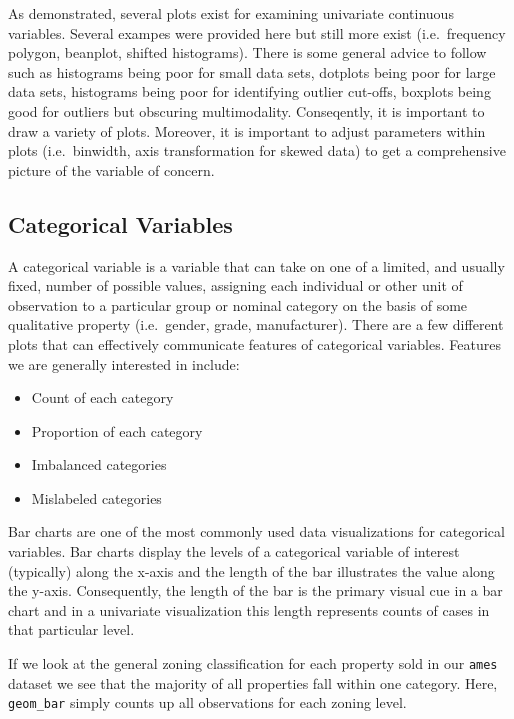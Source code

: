 \documentclass[]{article}
\providecommand{\tightlist}{%
  \setlength{\itemsep}{0pt}\setlength{\parskip}{0pt}}
\begin{document}
As demonstrated, several plots exist for examining univariate continuous
variables. Several exampes were provided here but still more exist
(i.e.~frequency polygon, beanplot, shifted histograms). There is some
general advice to follow such as histograms being poor for small data
sets, dotplots being poor for large data sets, histograms being poor for
identifying outlier cut-offs, boxplots being good for outliers but
obscuring multimodality. Conseqently, it is important to draw a variety
of plots. Moreover, it is important to adjust parameters within plots
(i.e.~binwidth, axis transformation for skewed data) to get a
comprehensive picture of the variable of concern.

\subsection{Categorical Variables}\label{categorical-variables}

A categorical variable is a variable that can take on one of a limited,
and usually fixed, number of possible values, assigning each individual
or other unit of observation to a particular group or nominal category
on the basis of some qualitative property (i.e.~gender, grade,
manufacturer). There are a few different plots that can effectively
communicate features of categorical variables. Features we are generally
interested in include:

\begin{itemize}
\tightlist
\item
  Count of each category
\item
  Proportion of each category
\item
  Imbalanced categories
\item
  Mislabeled categories
\end{itemize}

Bar charts are one of the most commonly used data visualizations for
categorical variables. Bar charts display the levels of a categorical
variable of interest (typically) along the x-axis and the length of the
bar illustrates the value along the y-axis. Consequently, the length of
the bar is the primary visual cue in a bar chart and in a univariate
visualization this length represents counts of cases in that particular
level.

If we look at the general zoning classification for each property sold
in our \texttt{ames} dataset we see that the majority of all properties
fall within one category. Here, \texttt{geom\_bar} simply counts up all
observations for each zoning level.
\end{document}
